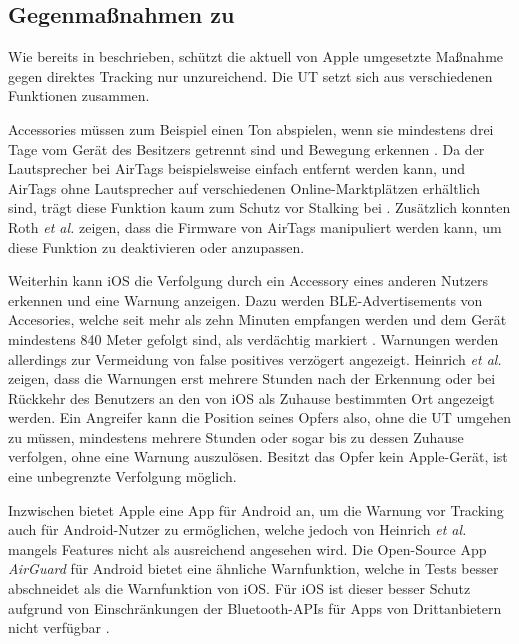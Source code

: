 \subsection{Gegenmaßnahmen zu }

Wie bereits in  beschrieben, schützt die aktuell von Apple umgesetzte Maßnahme gegen direktes Tracking nur unzureichend.
Die \ac{UT} setzt sich aus verschiedenen Funktionen zusammen.

Accessories müssen zum Beispiel einen Ton abspielen, wenn sie mindestens drei Tage vom Gerät des Besitzers getrennt sind und Bewegung erkennen \cite{Apple_FindMySpec}.
Da der Lautsprecher bei AirTags beispielsweise einfach entfernt werden kann, und AirTags ohne Lautsprecher auf verschiedenen Online-Marktplätzen erhältlich sind, trägt diese Funktion kaum zum Schutz vor Stalking bei \cite{Heinrich_AirGuard}.
Zusätzlich konnten Roth \textit{et al.} \cite{Roth_airtags} zeigen, dass die Firmware von AirTags manipuliert werden kann, um diese Funktion zu deaktivieren oder anzupassen.

Weiterhin kann iOS die Verfolgung durch ein Accessory eines anderen Nutzers erkennen und eine Warnung anzeigen.
Dazu werden \ac{BLE}-Advertisements von Accesories, welche seit mehr als zehn Minuten empfangen werden und dem Gerät mindestens 840 Meter gefolgt sind, als verdächtig markiert \cite{Heinrich_AirGuard}.
Warnungen werden allerdings zur Vermeidung von false positives verzögert angezeigt.
Heinrich \textit{et al.} \cite{Heinrich_AirGuard} zeigen, dass die Warnungen erst mehrere Stunden nach der Erkennung oder bei Rückkehr des Benutzers an den von iOS als Zuhause bestimmten Ort angezeigt werden.
Ein Angreifer kann die Position seines Opfers also, ohne die \ac{UT} umgehen zu müssen, mindestens mehrere Stunden oder sogar bis zu dessen Zuhause verfolgen, ohne eine Warnung auszulösen.
Besitzt das Opfer kein Apple-Gerät, ist eine unbegrenzte Verfolgung möglich.

Inzwischen bietet Apple eine App für Android an, um die Warnung vor Tracking auch für Android-Nutzer zu ermöglichen, welche jedoch von Heinrich \textit{et al.} \cite{Heinrich_AirGuard} mangels Features nicht als ausreichend angesehen wird.
Die Open-Source App \textit{AirGuard} für Android bietet eine ähnliche Warnfunktion, welche in Tests besser abschneidet als die Warnfunktion von iOS.
Für iOS ist dieser besser Schutz aufgrund von Einschränkungen der Bluetooth-\acp{API} für Apps von Drittanbietern nicht verfügbar \cite{Heinrich_AirGuard}.

